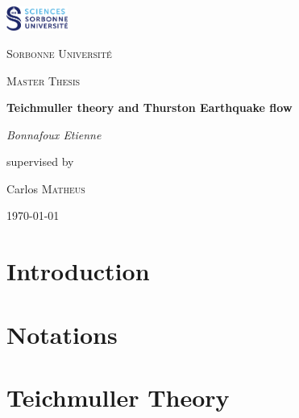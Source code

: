 \documentclass[12pt]{article}
\theoremstyle{plain}%
\theoremstyle{definition}
\theoremstyle{remark}
\begin{document}

\begin{titlepage}
	\centering
	\includegraphics[width=0.15\textwidth]{Image/Sorbonne.png}\par\vspace{1cm}
	{\scshape\LARGE Sorbonne Université \par}
	\vspace{1cm}
	{\scshape\Large Master Thesis\par}
	\vspace{1.5cm}
	{\huge\bfseries Teichmuller theory and Thurston Earthquake flow\par}
	\vspace{2cm}
	{\Large\itshape Bonnafoux Etienne\par}
	\vfill
	supervised by\par
	Carlos \textsc{Matheus}

	\vfill

	{\large \today\par}
\end{titlepage}

\newpage


\newpage

\tableofcontents
\newpage

\section{Introduction}

\newpage

\section{Notations}
\printnomenclature

\newpage

\section{Teichmuller Theory}

\newpage
\end{document}
